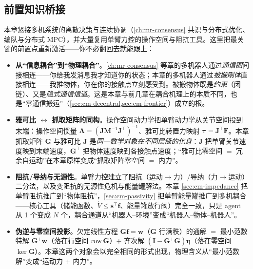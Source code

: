 \subsection*{前置知识桥接}
本章紧接多机系统的离散决策与连续协调（\cref{ch:mr-consensus} 共识与分布式优化、编队与分布式 MPC），并大量复用单臂力控的操作空间与阻抗工具。这里把最关键的前置点重新激活——你不必翻回去就能跟上：
\begin{itemize}
  \item \textbf{从“信息耦合”到“物理耦合”}。\cref{ch:mr-consensus} 等章的多机器人通过\emph{通信图}间接相连——你给我发消息我才知道你的状态；本章的多机器人通过\emph{被搬刚体}直接相连——我推物体，你在你的接触点立刻感受到。被搬物体既是\emph{约束}（闭链）、又是\emph{隐式通信信道}。这是本章与前几章在耦合机理上的本质不同，也是“零通信搬运”（\cref{sec:cm-decentral,sec:cm-frontier}）成立的根。
  \item \textbf{雅可比 $\leftrightarrow$ 抓取矩阵的同构}。操作空间动力学把单臂动力学从关节空间投到末端：操作空间惯量 $\boldsymbol{\Lambda}=(\mathbf{J}\mathbf{M}^{-1}\mathbf{J}^\top)^{-1}$、雅可比转置力映射 $\boldsymbol{\tau}=\mathbf{J}^\top\mathbf{F}$。本章抓取矩阵 $\mathbf{G}$ 与雅可比 $\mathbf{J}$ 是\emph{同一数学对象在不同层级的化身}：$\mathbf{J}$ 把单臂关节速度映到末端速度，$\mathbf{G}^\top$ 把物体速度映到各接触点速度；“雅可比零空间 $=$ 冗余自运动”在本章原样变成“抓取矩阵零空间 $=$ 内力”。
  \item \textbf{阻抗/导纳与无源性}。单臂力控建立了阻抗（运动$\to$力）/导纳（力$\to$运动）二分法，以及变阻抗的无源性危机与能量罐解法。本章 \cref{sec:cm-impedance} 把单臂阻抗推广到“物体阻抗”，\cref{sec:cm-passivity} 把单臂能量罐推广到多机耦合——核心工具（储能函数、$\dot V\le\mathbf{s}^\top\mathbf{f}$、能量罐放行阀）完全一致，只是 agent 从 1 个变成 $N$ 个，耦合通道从“机器人–环境”变成“机器人–物体–机器人”。
  \item \textbf{伪逆与零空间投影}。欠定线性方程 $\mathbf{G}\mathbf{f}=\mathbf{w}$（$\mathbf{G}$ 行满秩）的通解 $=$ 最小范数特解 $\mathbf{G}^{+}\mathbf{w}$（落在行空间 $\operatorname{row}\mathbf{G}$）$+$ 齐次解 $(\mathbf{I}-\mathbf{G}^{+}\mathbf{G})\boldsymbol{\eta}$（落在零空间 $\ker\mathbf{G}$）。本章这两个对象会以完全相同的形式出现，物理含义从“最小范数解”变成“运动力 $+$ 内力”。
\end{itemize}

